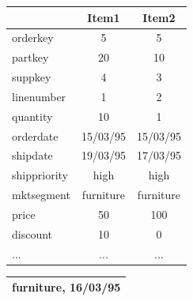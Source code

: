 \documentclass{vldb}
\begin{document}
\begin{table}
	\small
	\setlength\tabcolsep{5pt}
	\begin{minipage}{0.26\textwidth}
	\begin{tabular}{lcc}
		\multicolumn{1}{c}{}               & Item1                          & Item2                          \\ \hline
		\multicolumn{1}{|l|}{orderkey}     & \multicolumn{1}{c|}{5}         & \multicolumn{1}{c|}{5}         \\
		\multicolumn{1}{|l|}{partkey}      & \multicolumn{1}{c|}{20}        & \multicolumn{1}{c|}{10}        \\
		\multicolumn{1}{|l|}{suppkey}      & \multicolumn{1}{c|}{4}         & \multicolumn{1}{c|}{3}         \\
		\multicolumn{1}{|l|}{linenumber}   & \multicolumn{1}{c|}{1}         & \multicolumn{1}{c|}{2}         \\
		\multicolumn{1}{|l|}{quantity}     & \multicolumn{1}{c|}{10}        & \multicolumn{1}{c|}{1}         \\
		\multicolumn{1}{|l|}{orderdate}    & \multicolumn{1}{c|}{15/03/95}  & \multicolumn{1}{c|}{15/03/95}  \\
		\multicolumn{1}{|l|}{shipdate}     & \multicolumn{1}{c|}{19/03/95}  & \multicolumn{1}{c|}{17/03/95}  \\
		\multicolumn{1}{|l|}{shippriority} & \multicolumn{1}{c|}{high}      & \multicolumn{1}{c|}{high}      \\
		\multicolumn{1}{|l|}{mktsegment}   & \multicolumn{1}{c|}{furniture} & \multicolumn{1}{c|}{furniture} \\
		\multicolumn{1}{|l|}{price}        & \multicolumn{1}{c|}{50}        & \multicolumn{1}{c|}{100}       \\
		\multicolumn{1}{|l|}{discount}     & \multicolumn{1}{c|}{10}        & \multicolumn{1}{c|}{0}         \\
		\multicolumn{1}{|l|}{...}          & \multicolumn{1}{c|}{...}       & \multicolumn{1}{c|}{...}       \\ \hline
	\end{tabular}
		\vspace{1em}
		\label{table:new_lineitems}
	\end{minipage}
	\begin{minipage}{0.2\textwidth}
	\begin{tabular}{lc}
		\multicolumn{2}{c}{furniture, 16/03/95}                            \\ \hline

\end{tabular}
\end{minipage}
\end{table}
\end{document}
